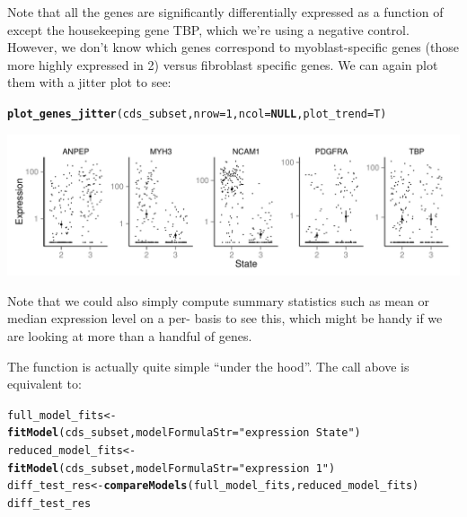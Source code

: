 \documentclass[10pt,oneside]{article}\usepackage[]{graphicx}\usepackage[]{color}
\makeatletter
\def\maxwidth{ %
  \ifdim\Gin@nat@width>\linewidth
    \linewidth
  \else
    \Gin@nat@width
  \fi
}
\newcommand{\hlnum}[1]{\textcolor[rgb]{0.686,0.059,0.569}{#1}}%
\newcommand{\hlstr}[1]{\textcolor[rgb]{0.192,0.494,0.8}{#1}}%
\newcommand{\hlstd}[1]{\textcolor[rgb]{0.345,0.345,0.345}{#1}}%
\newcommand{\hlkwa}[1]{\textcolor[rgb]{0.161,0.373,0.58}{\textbf{#1}}}%
\newcommand{\hlkwb}[1]{\textcolor[rgb]{0.69,0.353,0.396}{#1}}%
\newcommand{\hlkwc}[1]{\textcolor[rgb]{0.333,0.667,0.333}{#1}}%
\newcommand{\hlkwd}[1]{\textcolor[rgb]{0.737,0.353,0.396}{\textbf{#1}}}%
\newenvironment{kframe}{%
 \def\at@end@of@kframe{}%
 \ifinner\ifhmode%
  \def\at@end@of@kframe{\end{minipage}}%
  \begin{minipage}{\columnwidth}%
 \fi\fi%
 \def\FrameCommand##1{\hskip\@totalleftmargin \hskip-\fboxsep
 \colorbox{shadecolor}{##1}\hskip-\fboxsep
     \hskip-\linewidth \hskip-\@totalleftmargin \hskip\columnwidth}%
 \MakeFramed {\advance\hsize-\width
   \@totalleftmargin\z@ \linewidth\hsize
   \@setminipage}}%
 {\par\unskip\endMakeFramed%
 \at@end@of@kframe}
\newenvironment{knitrout}{}{} %
\makeatother
\begin{document}
Note that all the genes are significantly differentially expressed as a function of  except the housekeeping gene TBP, which we're using a negative control.  However, we don't know which genes correspond to myoblast-specific genes (those more highly expressed in  2) versus fibroblast specific genes.  We can again plot them with a jitter plot to see:

\begin{knitrout}
\color{fgcolor}\begin{kframe}
\begin{alltt}
\hlkwd{plot_genes_jitter}\hlstd{(cds_subset,} \hlkwc{nrow} \hlstd{=} \hlnum{1}\hlstd{,} \hlkwc{ncol} \hlstd{=} \hlkwa{NULL}\hlstd{,} \hlkwc{plot_trend} \hlstd{= T)}
\end{alltt}
\end{kframe}

{\centering \includegraphics[width=\maxwidth]{figure/jitter_plot_diff_res} 

}



\end{knitrout}


Note that we could also simply compute summary statistics such as mean or median expression level on a per- basis to see this, which might be handy if we are looking at more than a handful of genes.

The  function is actually quite simple ``under the hood''.  The call above is equivalent to:
\begin{knitrout}
\color{fgcolor}\begin{kframe}
\begin{alltt}
\hlstd{full_model_fits} \hlkwb{<-} \hlkwd{fitModel}\hlstd{(cds_subset,} \hlkwc{modelFormulaStr} \hlstd{=} \hlstr{"expression~State"}\hlstd{)}
\hlstd{reduced_model_fits} \hlkwb{<-} \hlkwd{fitModel}\hlstd{(cds_subset,} \hlkwc{modelFormulaStr} \hlstd{=} \hlstr{"expression~1"}\hlstd{)}
\hlstd{diff_test_res} \hlkwb{<-} \hlkwd{compareModels}\hlstd{(full_model_fits, reduced_model_fits)}
\hlstd{diff_test_res}
\end{alltt}
\end{kframe}
\end{knitrout}
\end{document}
